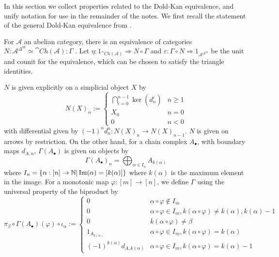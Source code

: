 In this section we collect properties related to the Dold-Kan equivalence, and unify notation for use in the remainder of the notes. We first recall the statement of the general Dold-Kan equivalence from \cite[Thm 14.24.3]{StacksProject}.

\begin{thm}[label=thm:DoldKanEquiv]{}
    For $\mathcal{A}$ an abelian category, there is an equivalence of categories $N :\mathcal{A}^{\Delta^{op}}\simeq \cat{Ch}(\mathcal{A}): \Gamma$ \cite{StacksProject}. Let $\eta:1_{\cat{Ch}(\mathcal{A})}\Rightarrow N\circ \Gamma$ and $\varepsilon:\Gamma\circ N\Rightarrow 1_{\mathcal{A}^{\Delta^{op}}}$ be the unit and counit for the equivalence, which can be chosen to satisfy the triangle identities.

    $N$ is given explicitly on a simplicial object $X$ by
    \begin{equation*}
        N(X)_n := \left\{\begin{array}{cc} \bigcap_{i=0}^{n-1}\ker(d_n^i) & n \geq 1 \\ X_0 & n = 0 \\ 0 & n < 0 \end{array}\right.
    \end{equation*}
    with differential given by $(-1)^nd_n^n:N(X)_n\rightarrow N(X)_{n-1}$. $N$ is given on arrows by restriction. On the other hand, for a chain complex $A_\bullet$, with boundary maps $d_{A,n}$, $\Gamma(A_\bullet)$ is given on objects by 
    \begin{equation*}
        \Gamma(A_\bullet)_n = \bigoplus_{\alpha\in I_n}A_{k(\alpha)}
    \end{equation*}
    where $I_n = \{\alpha:[n]\rightarrow \mathbb N\vert \operatorname{Im}(\alpha) = [k(\alpha)]\}$ where $k(\alpha)$ is the maximum element in the image. For a monotonic map $\varphi:[m]\rightarrow [n]$, we define $\Gamma$ using the universal property of the biproduct by
    \begin{equation*}
        \pi_\beta\circ \Gamma(A_\bullet)(\varphi)\circ \iota_\alpha := \left\{\begin{array}{cc} 0 & \alpha\circ \varphi \notin I_m \\ 0 & \alpha\circ \varphi \in I_m, k(\alpha\circ \varphi) \neq k(\alpha),k(\alpha)-1 \\ 0 & k(\alpha\circ \varphi) \neq \beta \\ 1_{A_{k(\alpha)}} & \alpha\circ \varphi \in I_m, k(\alpha\circ \varphi) = k(\alpha) \\  (-1)^{k(\alpha)}d_{A,k(\alpha)} & \alpha\circ \varphi \in I_m, k(\alpha\circ \varphi) = k(\alpha)-1\end{array}\right.
    \end{equation*}
\end{thm}

